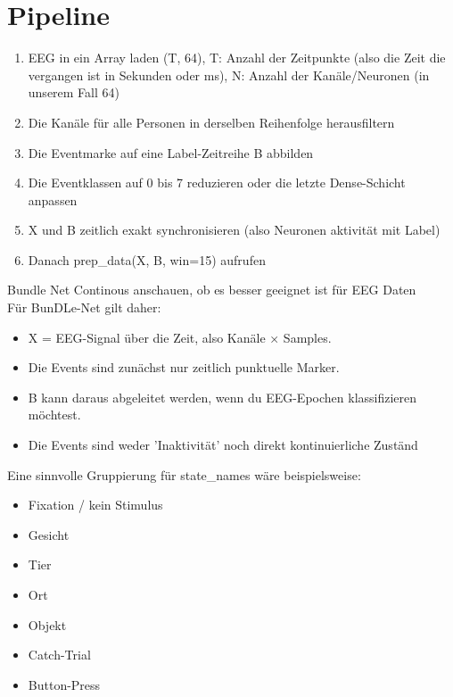 \documentclass{article}
\begin{document}
\section{Pipeline}
\begin{enumerate}
    \item EEG in ein Array laden (T, 64), T: Anzahl der Zeitpunkte (also die Zeit die vergangen ist in Sekunden oder ms), N: Anzahl der Kanäle/Neuronen (in unserem Fall 64)
    \item Die Kanäle für alle Personen in derselben Reihenfolge herausfiltern
    \item Die Eventmarke auf eine Label-Zeitreihe B abbilden
    \item Die Eventklassen auf 0 bis 7 reduzieren oder die letzte Dense-Schicht anpassen
    \item X und B zeitlich exakt synchronisieren (also Neuronen aktivität mit Label)
    \item Danach prep\_data(X, B, win=15) aufrufen
\end{enumerate}

Bundle Net Continous anschauen, ob es besser geeignet ist für EEG Daten \\


Für BunDLe-Net gilt daher:

\begin{itemize}
    \item X = EEG-Signal über die Zeit, also Kanäle × Samples.
    \item Die Events sind zunächst nur zeitlich punktuelle Marker.
    \item B kann daraus abgeleitet werden, wenn du EEG-Epochen klassifizieren möchtest.
    \item Die Events sind weder 'Inaktivität' noch direkt kontinuierliche Zuständ
\end{itemize}

Eine sinnvolle Gruppierung für state\_names wäre beispielsweise:

\begin{itemize}
    \item Fixation / kein Stimulus
    \item Gesicht
    \item Tier
    \item Ort
    \item Objekt
    \item Catch-Trial
    \item Button-Press
\end{itemize}
\end{document}
